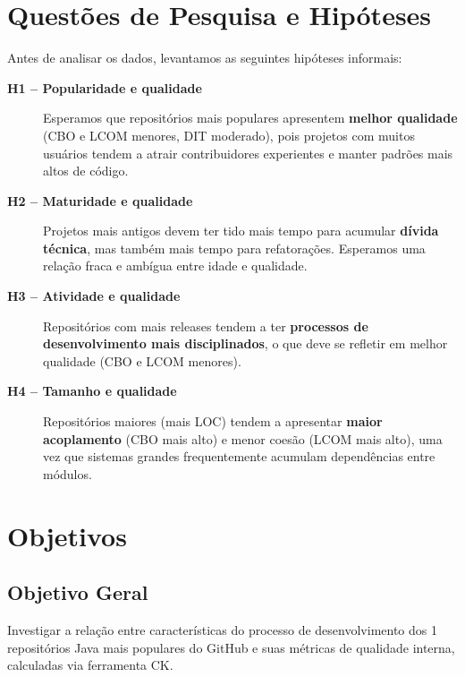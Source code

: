 \documentclass[10pt,a4paper,twocolumn]{article}
\begin{document}
\section{Questões de Pesquisa e Hipóteses}

Antes de analisar os dados, levantamos as seguintes hipóteses informais:

\begin{description}
  \item[\textbf{H1 -- Popularidade e qualidade}]
    Esperamos que repositórios mais populares apresentem \textbf{melhor
    qualidade} (CBO e LCOM menores, DIT moderado), pois projetos com muitos
    usuários tendem a atrair contribuidores experientes e manter padrões mais
    altos de código.

  \item[\textbf{H2 -- Maturidade e qualidade}]
    Projetos mais antigos devem ter tido mais tempo para acumular \textbf{dívida
    técnica}, mas também mais tempo para refatorações. Esperamos uma relação
    fraca e ambígua entre idade e qualidade.

  \item[\textbf{H3 -- Atividade e qualidade}]
    Repositórios com mais releases tendem a ter \textbf{processos de
    desenvolvimento mais disciplinados}, o que deve se refletir em melhor
    qualidade (CBO e LCOM menores).

  \item[\textbf{H4 -- Tamanho e qualidade}]
    Repositórios maiores (mais LOC) tendem a apresentar \textbf{maior
    acoplamento} (CBO mais alto) e menor coesão (LCOM mais alto), uma vez que
    sistemas grandes frequentemente acumulam dependências entre módulos.
\end{description}

\section{Objetivos}

\subsection{Objetivo Geral}

Investigar a relação entre características do processo de desenvolvimento dos
1 repositórios Java mais populares do GitHub e suas métricas de
qualidade interna, calculadas via ferramenta CK.
\end{document}
